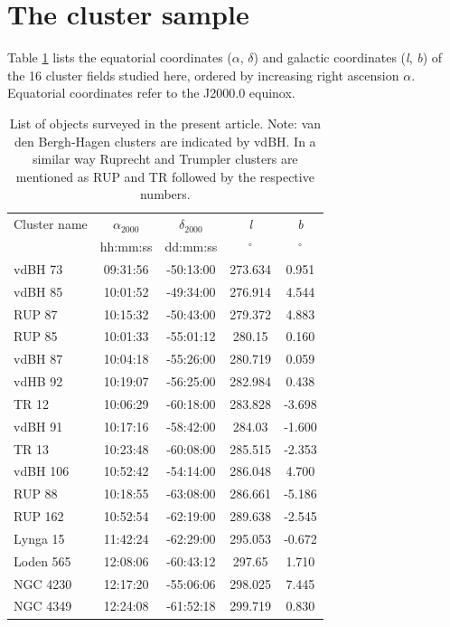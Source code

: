 \documentclass[draft]{aa}
\begin{document}
\section{The cluster sample}
\label{sec:clust_sample}

Table \ref{tab:clust_list} lists the equatorial coordinates ($\alpha$,
$\delta$) and galactic coordinates (\textit{l}, \textit{b}) of the 16 cluster
fields studied here, ordered by increasing right ascension $\alpha$.
Equatorial coordinates refer to the J2000.0 equinox.

\begin{table}[ht]
    \centering
\caption{List of objects surveyed in the present article. Note: van den
Bergh-Hagen clusters \citep{vdBH1975} are indicated by vdBH. In a similar   
way Ruprecht \citep{Ruprecht_1996} and Trumpler \citep{Trumpler_1930} clusters
are mentioned as RUP and TR followed by the respective numbers.}
    \begin{tabular}{lcccc}
    \hline \hline 
        Cluster name & $\alpha_{2000}$ & $\delta_{2000}$ & \emph{l} & \emph{b}\\
         & hh:mm:ss & dd:mm:ss & $^\circ$ & $^\circ$\\
       \hline
        vdBH 73 & 09:31:56 & -50:13:00 & 273.634 & 0.951\\
        vdBH 85 & 10:01:52 & -49:34:00 & 276.914 & 4.544\\
        RUP 87 & 10:15:32 & -50:43:00 & 279.372 & 4.883\\
        RUP 85 & 10:01:33 & -55:01:12 & 280.15 & 0.160\\
        vdBH 87 & 10:04:18 & -55:26:00 & 280.719 & 0.059\\
        vdHB 92 & 10:19:07 & -56:25:00 & 282.984 & 0.438\\
        TR 12 & 10:06:29 & -60:18:00 & 283.828 & -3.698\\
        vdBH 91 & 10:17:16 & -58:42:00 & 284.03 & -1.600\\
        TR 13 & 10:23:48 & -60:08:00 & 285.515 & -2.353\\
        vdBH 106 & 10:52:42 & -54:14:00 & 286.048 & 4.700\\
        RUP 88 & 10:18:55 & -63:08:00 & 286.661 & -5.186\\
        RUP 162 & 10:52:54 & -62:19:00 & 289.638 & -2.545\\
        Lynga 15 & 11:42:24 & -62:29:00 & 295.053 & -0.672\\
        Loden 565 & 12:08:06 & -60:43:12 & 297.65 & 1.710\\
        NGC 4230 & 12:17:20 & -55:06:06 & 298.025 & 7.445\\
        NGC 4349 & 12:24:08 & -61:52:18 & 299.719 & 0.830\\
        \hline
    \end{tabular}
    \label{tab:clust_list}
\end{table}
\end{document}
